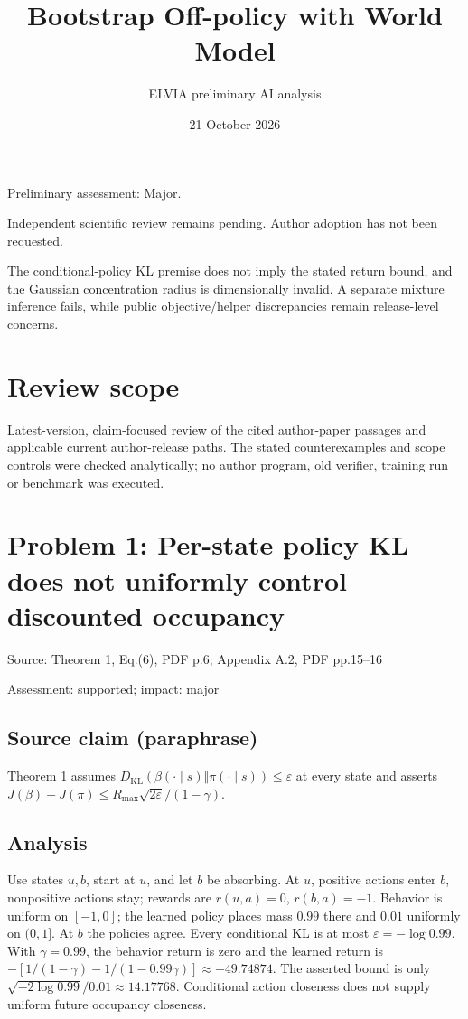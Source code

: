 \documentclass[11pt]{article}
\begin{document}
\title{Bootstrap Off-policy with World Model}

\author{ELVIA preliminary AI analysis}\date{21 October 2026}\maketitle

Preliminary assessment: Major.\par

Independent scientific review remains pending. Author adoption has not been requested.

The conditional-policy KL premise does not imply the stated return bound, and the Gaussian concentration radius is dimensionally invalid. A separate mixture inference fails, while public objective/helper discrepancies remain release-level concerns.

\section*{Review scope}

Latest-version, claim-focused review of the cited author-paper passages and applicable current author-release paths. The stated counterexamples and scope controls were checked analytically; no author program, old verifier, training run or benchmark was executed.

\section*{Problem 1: Per-state policy KL does not uniformly control discounted occupancy}

Source: Theorem 1, Eq.(6), PDF p.6; Appendix A.2, PDF pp.15–16

Assessment: supported; impact: major

\subsection*{Source claim (paraphrase)}

Theorem 1 assumes \(D_{\mathrm{KL}}(\beta(\cdot\mid s)\Vert\pi(\cdot\mid s))\leq\varepsilon\) at every state and asserts \(J(\beta)-J(\pi)\leq R_{\max}\sqrt{2\varepsilon}/(1-\gamma)\).

\subsection*{Analysis}

Use states \(u,b\), start at \(u\), and let \(b\) be absorbing. At \(u\), positive actions enter \(b\), nonpositive actions stay; rewards are \(r(u,a)=0\), \(r(b,a)=-1\). Behavior is uniform on \([-1,0]\); the learned policy places mass \(0.99\) there and \(0.01\) uniformly on \((0,1]\). At \(b\) the policies agree. Every conditional KL is at most \(\varepsilon=-\log0.99\). With \(\gamma=0.99\), the behavior return is zero and the learned return is \(-[1/(1-\gamma)-1/(1-0.99\gamma)]\approx-49.74874\). The asserted bound is only \(\sqrt{-2\log0.99}/0.01\approx14.17768\). Conditional action closeness does not supply uniform future occupancy closeness.
\end{document}
